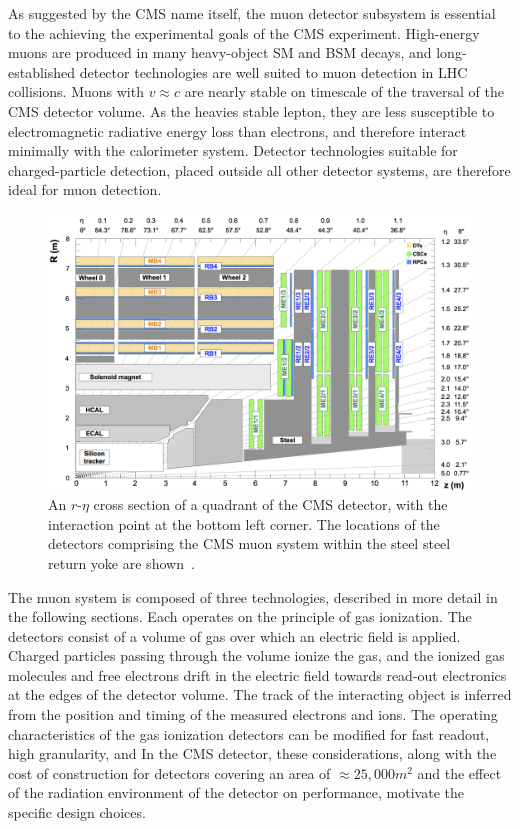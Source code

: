 As suggested by the CMS name itself, the muon detector subsystem is essential to the
achieving the experimental goals of the CMS experiment. 
High-energy muons are produced in many heavy-object SM and BSM 
decays, and long-established detector technologies are well suited to muon detection in LHC collisions.
Muons with $v\approx c$ are nearly stable
on timescale of the traversal of the CMS detector volume. As the heavies stable lepton, 
they are less susceptible to electromagnetic radiative energy loss than electrons, and therefore
interact minimally with the calorimeter system. Detector technologies suitable for
charged-particle detection, placed outside all other detector systems, 
are therefore ideal for muon detection. 

\begin{figure}[htbp]
  \centering
   \includegraphics[width=\textwidth]{figures/LHCandCMS/MuonSystemGeometry.png}
  \caption[An $r$-$\eta$ cross section of a quadrant of the CMS detector]{
    An $r$-$\eta$ cross section of a quadrant of the CMS detector, with the interaction
    point at the bottom left corner. The locations of the detectors
    comprising the CMS muon system within the steel steel return yoke
    are shown~\cite{Chatrchyan:2012xdj}.
        }
 \label{fig:muonSystemGeo}
\end{figure}

The muon system is composed of three technologies, 
described in more detail in the following sections. 
Each operates on the principle of gas ionization. 
The detectors consist of a volume of 
gas over which an electric field is applied. Charged
particles passing through the volume ionize the gas, and the ionized gas molecules
and free electrons drift in the electric field towards read-out electronics at the 
edges of the detector volume. The track of the interacting object is inferred from
the position and timing of the measured electrons and ions.
The operating characteristics of the gas ionization detectors can be modified
for fast readout, high granularity, and 
In the CMS detector, these considerations, along with the cost of construction 
for detectors covering an area of $\approx 25,000\unit{m}^2$ and 
the effect of the radiation environment of the detector on performance, motivate
the specific design choices.

